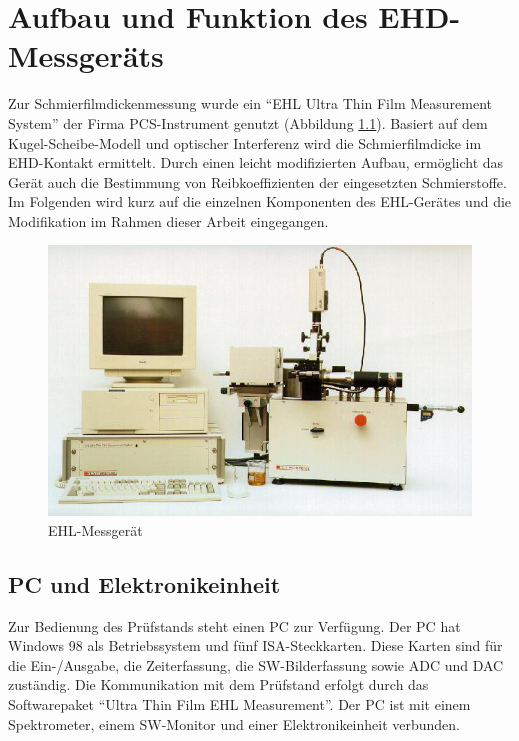 \chapter{Aufbau und Funktion des EHD-Messgeräts}
\label{chap:aufbau_und_funktion_des_ehd_messgeraets}

Zur Schmierfilmdickenmessung wurde ein ``EHL Ultra Thin Film Measurement System'' der Firma PCS-Instrument genutzt (Abbildung \ref{fig:ehl_messgeraet}).
Basiert auf dem Kugel-Scheibe-Modell und optischer Interferenz wird die Schmierfilmdicke im EHD-Kontakt ermittelt.
Durch einen leicht modifizierten Aufbau, ermöglicht das Gerät auch die Bestimmung von Reibkoeffizienten der eingesetzten Schmierstoffe.
Im Folgenden wird kurz auf die einzelnen Komponenten des EHL-Gerätes und die Modifikation im Rahmen dieser Arbeit eingegangen.

\begin{figure}[htb]
    \centering
    \includegraphics[width=0.8\linewidth]{./images/ehl_pruefstand.png}
    \caption{EHL-Messgerät \cite{ehl}}
    \label{fig:ehl_messgeraet}
\end{figure}

\section{PC und Elektronikeinheit}
\label{sec:pc_elektronikeinheit}

Zur Bedienung des Prüfstands steht einen PC zur Verfügung.
Der PC hat Windows 98 als Betriebssystem und fünf ISA-Steckkarten.
Diese Karten sind für die Ein-/Ausgabe, die Zeiterfassung, die SW-Bilderfassung sowie ADC und DAC zuständig.
Die Kommunikation mit dem Prüfstand erfolgt durch das Softwarepaket ``Ultra Thin Film EHL Measurement''.
Der PC ist mit einem Spektrometer, einem SW-Monitor und einer Elektronikeinheit verbunden.

